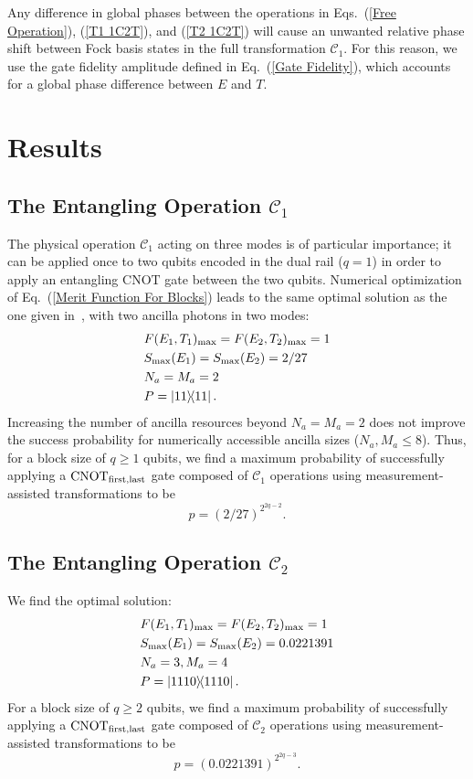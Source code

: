 \documentclass[aps,pra,twocolumn,showpacs,superscriptaddress,floatfix,10pt]{revtex4}
\begin{document}
Any difference in global phases between the operations in Eqs.~(\ref{Free Operation}), (\ref{T1 1C2T}), and (\ref{T2 1C2T}) will cause an unwanted relative phase shift between Fock basis states in the full transformation $\mathcal{C}_1$. For this reason, we use the gate fidelity amplitude defined in Eq.~(\ref{Gate Fidelity}), which accounts for a global phase difference between $E$ and $T$. 
\section{Results}
\label{Section on Results}
\subsection{The Entangling Operation $\mathcal{C}_1$}
The physical operation $\mathcal{C}_1$ acting on three modes is of particular importance; it can be applied once to two qubits encoded in the dual rail ($q=1$) in order to apply an entangling $\mbox{CNOT}$ gate between the two qubits. Numerical optimization of Eq.~(\ref{Merit Function For Blocks}) leads to the same optimal solution as the one given in~\cite{Uskov}, with two ancilla photons in two modes:
\begin{eqnarray}
& F(E_1,T_1)_{\rm max} = F(E_2,T_2)_{\rm max} = 1 \nonumber \\
& S_{\rm max}(E_1) = S_{\rm max}(E_2) = 2/27 \\
& N_a=M_a=2 \nonumber \\
& P = \outerproduct{11}{11} \nonumber	.
\end{eqnarray}
Increasing the number of ancilla resources beyond $N_a=M_a=2$ does not improve the success probability for numerically accessible ancilla sizes ($N_a,M_a \le 8$). Thus, for a block size of $q \ge 1$ qubits, we find a maximum probability of successfully applying a $\mbox{CNOT}_{\rm first,last}$ gate composed of $\mathcal{C}_1$ operations using measurement-assisted transformations to be
\begin{equation}
\label{1C2T Result}
p = (2/27)^{2^{2q-2}}.
\end{equation}
\subsection{The Entangling Operation $\mathcal{C}_2$}
We find the optimal solution:
\begin{eqnarray}
& F(E_1,T_1)_{\rm max} = F(E_2,T_2)_{\rm max} = 1 \nonumber \\
&S_{\rm max}(E_1) = S_{\rm max}(E_2) = 0.0221391 \\
&N_a = 3,M_a=4 \nonumber \\
&P = \outerproduct{1110}{1110} \nonumber	.
\end{eqnarray}
For a block size of $q \ge 2$ qubits, we find a maximum probability of successfully applying a $\mbox{CNOT}_{\rm first,last}$ gate composed of $\mathcal{C}_2$ operations  using measurement-assisted transformations to be
\begin{equation}
\label{2C2T Result}
p = (0.0221391)^{2^{2q-3}}.
\end{equation}
\end{document}
